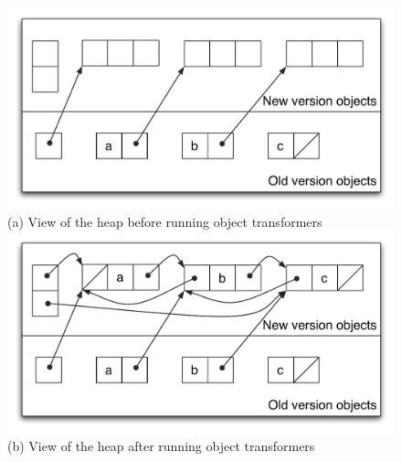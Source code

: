 \begin{figure}[t]
\begin{center}
\includegraphics[scale=0.48]{100-images/singly-doubly/new-world-singly-doubly-before-transform}
\\
(a) View of the heap before running object transformers \\[1ex]
\includegraphics[scale=0.48]{100-images/singly-doubly/new-world-singly-doubly-transformed}
\\
(b) View of the heap after running object transformers \\
\VspaceFixForHangcaption
\end{center}
\end{figure}
